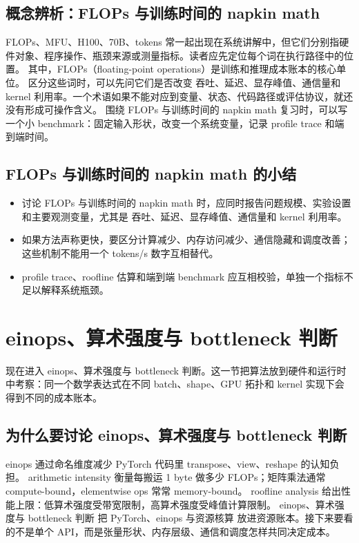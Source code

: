 \documentclass[a4paper]{article}
\begin{document}
\subsection{概念辨析：FLOPs 与训练时间的 napkin math}
FLOPs、MFU、H100、70B、tokens 常一起出现在系统讲解中，但它们分别指硬件对象、程序操作、瓶颈来源或测量指标。读者应先定位每个词在执行路径中的位置。
其中，FLOPs（floating-point operations）是训练和推理成本账本的核心单位。
区分这些词时，可以先问它们是否改变 吞吐、延迟、显存峰值、通信量和 kernel 利用率。一个术语如果不能对应到变量、状态、代码路径或评估协议，就还没有形成可操作含义。
围绕 FLOPs 与训练时间的 napkin math 复习时，可以写一个小 benchmark：固定输入形状，改变一个系统变量，记录 profile trace 和端到端时间。
\subsection{FLOPs 与训练时间的 napkin math 的小结}
\begin{itemize}
\item 讨论 FLOPs 与训练时间的 napkin math 时，应同时报告问题规模、实验设置和主要观测变量，尤其是 吞吐、延迟、显存峰值、通信量和 kernel 利用率。
\item 如果方法声称更快，要区分计算减少、内存访问减少、通信隐藏和调度改善；这些机制不能用一个 tokens/s 数字互相替代。
\item profile trace、roofline 估算和端到端 benchmark 应互相校验，单独一个指标不足以解释系统瓶颈。
\end{itemize}
\section{einops、算术强度与 bottleneck 判断}
现在进入 einops、算术强度与 bottleneck 判断。这一节把算法放到硬件和运行时中考察：同一个数学表达式在不同 batch、shape、GPU 拓扑和 kernel 实现下会得到不同的成本账本。
\subsection{为什么要讨论 einops、算术强度与 bottleneck 判断}
einops 通过命名维度减少 PyTorch 代码里 transpose、view、reshape 的认知负担。
arithmetic intensity 衡量每搬运 1 byte 做多少 FLOPs；矩阵乘法通常 compute-bound，elementwise ops 常常 memory-bound。
roofline analysis 给出性能上限：低算术强度受带宽限制，高算术强度受峰值计算限制。
einops、算术强度与 bottleneck 判断 把 PyTorch、einops 与资源核算 放进资源账本。接下来要看的不是单个 API，而是张量形状、内存层级、通信和调度怎样共同决定成本。
\end{document}
